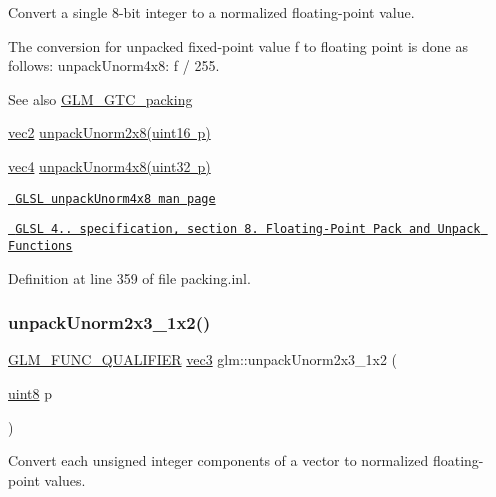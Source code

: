 Convert a single 8-\/bit integer to a normalized floating-\/point value.

The conversion for unpacked fixed-\/point value f to floating point is done as follows\+: unpack\+Unorm4x8\+: f / 255.

\begin{DoxySeeAlso}{See also}
\mbox{\hyperlink{group__gtc__packing}{G\+L\+M\+\_\+\+G\+T\+C\+\_\+packing}} 

\mbox{\hyperlink{group__core__types_gaa1618f51db67eaa145db101d8c8431d8}{vec2}} \mbox{\hyperlink{group__gtc__packing_ga96ce0c24339ee676e28a027fffd1edf6}{unpack\+Unorm2x8(uint16 p)}} 

\mbox{\hyperlink{group__core__types_ga5881b1b022d7fd1b7218f5916532dd02}{vec4}} \mbox{\hyperlink{group__core__func__packing_ga1ec646af4b27982d175672bddd642792}{unpack\+Unorm4x8(uint32 p)}} 

\href{http://www.opengl.org/sdk/docs/manglsl/xhtml/unpackUnorm4x8.xml}{\texttt{ G\+L\+SL unpack\+Unorm4x8 man page}} 

\href{http://www.opengl.org/registry/doc/GLSLangSpec.4.20.8.pdf}{\texttt{ G\+L\+SL 4.. specification, section 8. Floating-\/\+Point Pack and Unpack Functions}} 
\end{DoxySeeAlso}


Definition at line 359 of file packing.\+inl.

\mbox{\label{group__gtc__packing_gaeeacc5275329100c50fe8fc0871eb423}} 
\subsubsection{\texorpdfstring{unpackUnorm2x3\_1x2()}{unpackUnorm2x3\_1x2()}}
{\footnotesize\ttfamily \mbox{\hyperlink{setup_8hpp_a33fdea6f91c5f834105f7415e2a64407}{G\+L\+M\+\_\+\+F\+U\+N\+C\+\_\+\+Q\+U\+A\+L\+I\+F\+I\+ER}} \mbox{\hyperlink{group__core__types_ga1c47e8b3386109bc992b6c48e91b0be7}{vec3}} glm\+::unpack\+Unorm2x3\+\_\+1x2 (\begin{DoxyParamCaption}\item[{\mbox{\hyperlink{group__gtc__type__precision_ga1a7dcd8aac97cc8020817c94049deff2}{uint8}}}]{p }\end{DoxyParamCaption})}

Convert each unsigned integer components of a vector to normalized floating-\/point values.

